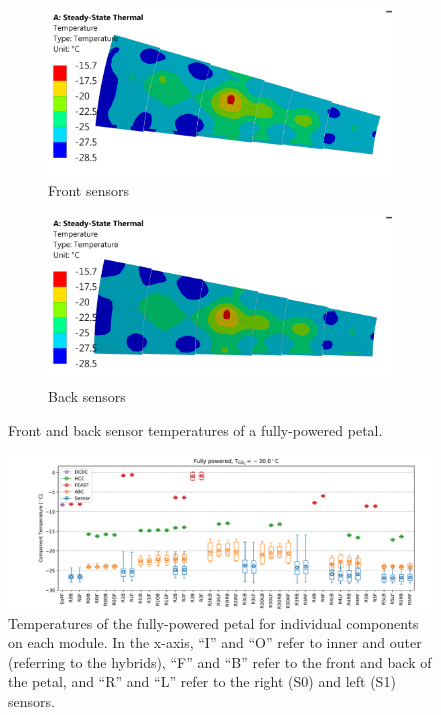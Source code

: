 \begin{figure}[ht!]
\begin{subfigure}[t]{0.50\textwidth}\includegraphics[width=0.99\linewidth]{figures/m30C_0Wm2C_DP0_F_20170117_Sensor_label_enlarged.png}\caption{Front sensors}\end{subfigure}
\begin{subfigure}[t]{0.50\textwidth}\includegraphics[width=0.99\linewidth]{figures/m30C_0Wm2C_DP0_B_20170117_Sensor_label_enlarged.png}\caption{Back sensors}\end{subfigure}\vspace{2mm}
\caption{Front and back sensor temperatures of a fully-powered petal.}
\label{sensor_temperatures}
\end{figure}

\begin{figure}[ht!]
\includegraphics[width=0.99\linewidth]{figures/FEA_20171207_m30p0C_0p0Wm2C_DP1_ALL_All_Bins_S0.pdf}
\caption{Temperatures of the fully-powered petal for individual components on each module. In the
x-axis, ``I'' and ``O'' refer to inner and outer (referring to the hybrids), ``F'' and ``B'' refer to
the front and back of the petal, and ``R'' and ``L'' refer to the right (S0) and left (S1) sensors.
}
\label{component_temperatures_detailed}
\end{figure}

